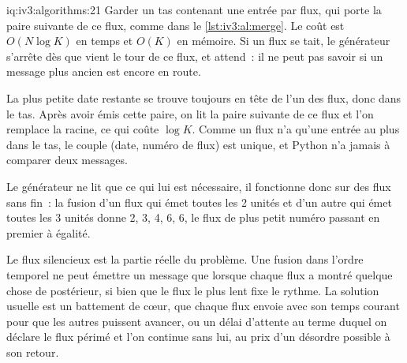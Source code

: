 \begin{solution}{iq:iv3:algorithms:21}
Garder un tas contenant une entrée par flux, qui porte la paire suivante de ce flux, comme dans le \cref{lst:iv3:al:merge}. Le coût est $O(N \log K)$ en temps et $O(K)$ en mémoire. Si un flux se tait, le générateur s'arrête dès que vient le tour de ce flux, et attend~: il ne peut pas savoir si un message plus ancien est encore en route.
\enlargethispage{-3\baselineskip}%
\label{lst:iv3:al:merge}

La plus petite date restante se trouve toujours en tête de l'un des flux, donc dans le tas. Après avoir émis cette paire, on lit la paire suivante de ce flux et l'on remplace la racine, ce qui coûte $\log K$. Comme un flux n'a qu'une entrée au plus dans le tas, le couple (date, numéro de flux) est unique, et Python n'a jamais à comparer deux messages.

Le générateur ne lit que ce qui lui est nécessaire, il fonctionne donc sur des flux sans fin~: la fusion d'un flux qui émet toutes les 2 unités et d'un autre qui émet toutes les 3 unités donne 2, 3, 4, 6, 6, le flux de plus petit numéro passant en premier à égalité.

Le flux silencieux est la partie réelle du problème. Une fusion dans l'ordre temporel ne peut émettre un message que lorsque chaque flux a montré quelque chose de postérieur, si bien que le flux le plus lent fixe le rythme. La solution usuelle est un battement de cœur, que chaque flux envoie avec son temps courant pour que les autres puissent avancer, ou un délai d'attente au terme duquel on déclare le flux périmé et l'on continue sans lui, au prix d'un désordre possible à son retour.

\end{solution}

